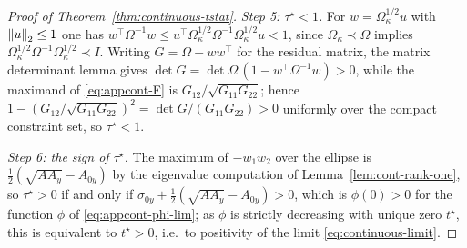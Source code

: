 \begin{proof}[Proof of Theorem~\ref{thm:continuous-tstat}]
{\emph{Step 5: $\tau^\star < 1$.} For $w = \Omega_\kappa^{1/2} u$ with
$\left\lVert u \right\rVert_2 \le 1$ one has $w^\top \Omega^{-1} w \le
u^\top \Omega_\kappa^{1/2} \Omega^{-1} \Omega_\kappa^{1/2} u < 1$, since
$\Omega_\kappa \prec \Omega$ implies
$\Omega_\kappa^{1/2}\Omega^{-1}\Omega_\kappa^{1/2} \prec I$. Writing
$G = \Omega - w w^\top$ for the residual matrix, the matrix determinant
lemma gives $\det G = \det \Omega\, (1 - w^\top \Omega^{-1} w) > 0$,
while the maximand of \eqref{eq:appcont-F} is
$G_{12} / \sqrt{G_{11} G_{22}}$; hence
$1 - \left( G_{12}/\sqrt{G_{11}G_{22}} \right)^2
= \det G / (G_{11} G_{22}) > 0$ uniformly over the compact constraint
set, so $\tau^\star < 1$.

\emph{Step 6: the sign of $\tau^\star$.} The maximum of
$-w_1 w_2 $ over the ellipse is $\tfrac12(\sqrt{A A_y} - A_{0y})$ by the
eigenvalue computation of Lemma~\ref{lem:cont-rank-one}, so
$\tau^\star > 0$ if and only if
$\sigma_{0y} + \tfrac12 (\sqrt{A A_y} - A_{0y}) > 0$, which is
$\phi(0) > 0$ for the function $\phi$ of \eqref{eq:appcont-phi-lim}; as
$\phi$ is strictly decreasing with unique zero $t^\star$, this is
equivalent to $t^\star > 0$, i.e.\ to positivity of the limit
\eqref{eq:continuous-limit}.}
\end{proof}

\begin{proposition}
\label{prop:cont-fisher}
\end{proposition}

